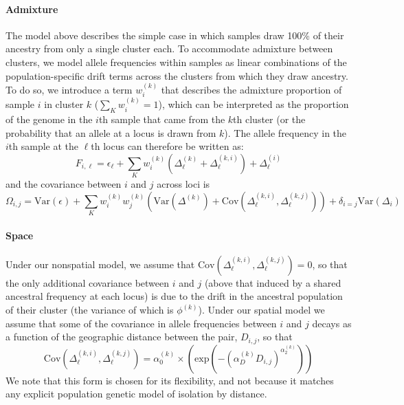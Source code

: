 \documentclass[12pt]{article}
\begin{document}
\paragraph{Admixture} 
The model above describes the simple case 
in which samples draw 100\% of their ancestry from only a single cluster each. 
To accommodate admixture between clusters, 
we model allele frequencies within samples as linear combinations of the population-specific 
drift terms across the clusters from which they draw ancestry.
To do so, we introduce a term $w^{(k)}_{i}$ that describes the
admixture proportion of sample $i$ in cluster $k$ ($\sum_{K}w^{(k)}_{i} = 1$),
which can be interpreted as the proportion of the genome in the $i$th
sample that came from the $k$th cluster 
(or the probability that an allele at a locus is drawn from $k$).
The allele frequency in the $i$th sample at the $\ell$th locus can therefore be written as:
\begin{equation}
F_{i,\ell} = \epsilon_{\ell} + \sum\limits_{K} w^{(k)}_{i}\left( 
  \Delta^{(k)}_{\ell} + \Delta^{(k,i)}_{\ell}\right) + \Delta^{(i)}_{\ell}	
\label{drift_terms_admix}
\end{equation}
and the covariance between $i$ and $j$ across loci is
\begin{equation}
\Omega_{i,j} = \text{Var}(\epsilon) + \sum\limits_K w^{(k)}_iw^{(k)}_j
\left(
  \text{Var}\left( \Delta^{(k)} \right) +
\text{Cov}(\Delta^{(k,i)}_{\ell},\Delta^{(k,j)}_{\ell}) 	\right) +
\delta_{i=j} \text{Var}(\Delta_i)
\label{admixed_spatial_cov}
\end{equation}

\paragraph{Space}
Under our nonspatial model, 
we assume that $\text{Cov}(\Delta^{(k,i)}_{\ell},\Delta^{(k,j)}_{\ell})=0$,
so that the only additional covariance between $i$ and $j$ 
(above that induced by a shared ancestral frequency at each locus)
is due to the drift in the ancestral population of their cluster 
(the variance of which is $\phi^{(k)}$). 
Under our spatial model we assume that some of the covariance in allele frequencies
between $i$ and $j$ decays as a function of the geographic distance
between the pair, $D_{i,j}$,
so that 
\begin{equation}
\text{Cov}(\Delta^{(k,i)}_{\ell},\Delta^{(k,j)}_{\ell}) = \alpha^{(k)}_0 \times \left(\text{exp} \left(  -(\alpha^{(k)}_D D_{i,j})^{\alpha^{(k)}_2}\right) \right)
\end{equation}
We note that this form is chosen for its flexibility, 
and not because it matches any explicit population genetic model of isolation by distance. 
\end{document}
